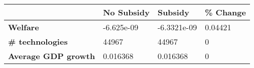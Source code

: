 \begin{tabular}{|l|l|l|l|}
\hline
&\textbf{No Subsidy}&\textbf{Subsidy}&\textbf{\% Change}\\\hline
\textbf{Welfare}&-6.625e-09&-6.3321e-09&0.04421\\\hline
\textbf{\# technologies}&44967&44967&0\\\hline
\textbf{Average GDP growth}&0.016368&0.016368&0\\\hline
\end{tabular}
